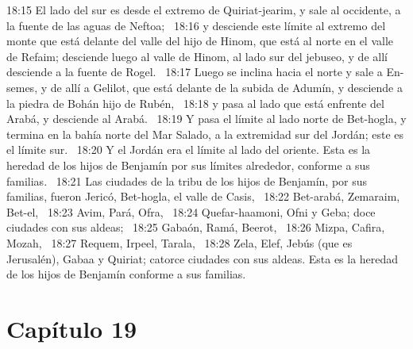 18:15 El lado del sur es desde el extremo de Quiriat-jearim, y sale al occidente, a la fuente de las aguas de Neftoa;  
18:16 y desciende este límite al extremo del monte que está delante del valle del hijo de Hinom, que está al norte en el valle de Refaim; desciende luego al valle de Hinom, al lado sur del jebuseo, y de allí desciende a la fuente de Rogel.  
18:17 Luego se inclina hacia el norte y sale a En-semes, y de allí a Gelilot, que está delante de la subida de Adumín, y desciende a la piedra de Bohán hijo de Rubén,  
18:18 y pasa al lado que está enfrente del Arabá, y desciende al Arabá.  
18:19 Y pasa el límite al lado norte de Bet-hogla, y termina en la bahía norte del Mar Salado, a la extremidad sur del Jordán; este es el límite sur.  
18:20 Y el Jordán era el límite al lado del oriente. Esta es la heredad de los hijos de Benjamín por sus límites alrededor, conforme a sus familias.  
18:21 Las ciudades de la tribu de los hijos de Benjamín, por sus familias, fueron Jericó, Bet-hogla, el valle de Casis,  
18:22 Bet-arabá, Zemaraim, Bet-el,  
18:23 Avim, Pará, Ofra,  
18:24 Quefar-haamoni, Ofni y Geba; doce ciudades con sus aldeas;  
18:25 Gabaón, Ramá, Beerot,  
18:26 Mizpa, Cafira, Mozah,  
18:27 Requem, Irpeel, Tarala,  
18:28 Zela, Elef, Jebús (que es Jerusalén), Gabaa y Quiriat; catorce ciudades con sus aldeas. Esta es la heredad de los hijos de Benjamín conforme a sus familias.  
\section*{Capítulo 19}

